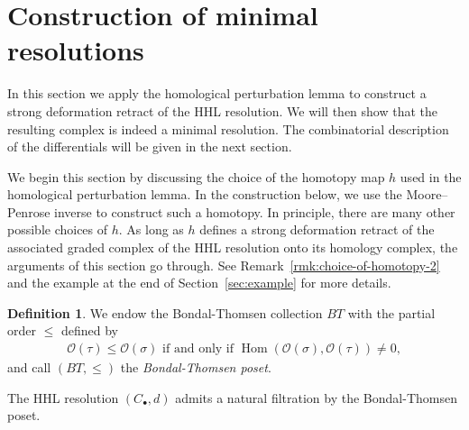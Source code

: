 \documentclass[11pt,reqno]{amsart}
\theoremstyle{definition}
\newtheorem{definition}[theorem]{Definition}
\numberwithin{equation}{section}
\begin{document}
\section{Construction of minimal resolutions}\label{sec:construction}

In this section we apply the homological perturbation lemma to construct a strong deformation retract of the HHL resolution. We will then show that the resulting complex is indeed a minimal resolution. The combinatorial description of the differentials will be given in the next section.

\smallskip

We begin this section by discussing the choice of the homotopy map \(h\) used in the homological perturbation lemma. In the construction below, we use the Moore--Penrose inverse to construct such a homotopy. In principle, there are many other possible choices of \(h\). As long as \(h\) defines a strong deformation retract of the associated graded complex of the HHL resolution onto its homology complex, the arguments of this section go through. See Remark~\ref{rmk:choice-of-homotopy-2} and the example at the end of Section~\ref{sec:example} for more details.

\smallskip

\begin{definition}
    We endow the Bondal-Thomsen collection $BT$ with the partial order $\leq$ defined by
    \begin{align*}
    \mathcal{O}(\tau) \leq \mathcal{O}(\sigma) \text{ if and only if } \operatorname{Hom}(\mathcal{O}(\sigma), \mathcal{O}(\tau)) \neq 0,
\end{align*}
and call $(BT,\leq)$ the \textit{Bondal-Thomsen poset}.
\end{definition}

The HHL resolution $(C_{\bullet},d)$ admits a natural filtration by the Bondal-Thomsen poset.
\end{document}
